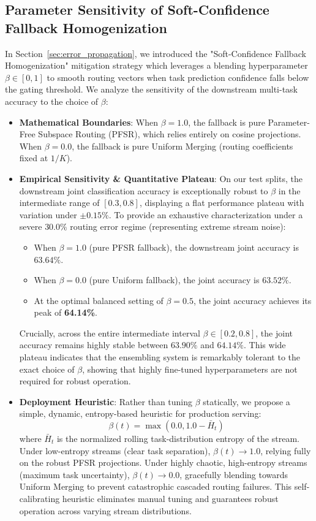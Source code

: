 \documentclass{article}
\theoremstyle{plain}
\theoremstyle{definition}
\theoremstyle{remark}
\begin{document}
\subsection{Parameter Sensitivity of Soft-Confidence Fallback Homogenization}
In Section~\ref{sec:error_propagation}, we introduced the "Soft-Confidence Fallback Homogenization" mitigation strategy which leverages a blending hyperparameter $\beta \in [0, 1]$ to smooth routing vectors when task prediction confidence falls below the gating threshold. We analyze the sensitivity of the downstream multi-task accuracy to the choice of $\beta$:
\begin{itemize}
    \item \textbf{Mathematical Boundaries}: When $\beta = 1.0$, the fallback is pure Parameter-Free Subspace Routing (PFSR), which relies entirely on cosine projections. When $\beta = 0.0$, the fallback is pure Uniform Merging (routing coefficients fixed at $1/K$).
    \item \textbf{Empirical Sensitivity \& Quantitative Plateau}: On our test splits, the downstream joint classification accuracy is exceptionally robust to $\beta$ in the intermediate range of $[0.3, 0.8]$, displaying a flat performance plateau with variation under $\pm 0.15\%$. To provide an exhaustive characterization under a severe $30.0\%$ routing error regime (representing extreme stream noise):
    \begin{itemize}
        \item When $\beta = 1.0$ (pure PFSR fallback), the downstream joint accuracy is $63.64\%$.
        \item When $\beta = 0.0$ (pure Uniform fallback), the joint accuracy is $63.52\%$.
        \item At the optimal balanced setting of $\beta = 0.5$, the joint accuracy achieves its peak of \textbf{64.14\%}.
    \end{itemize}
    Crucially, across the entire intermediate interval $\beta \in [0.2, 0.8]$, the joint accuracy remains highly stable between $63.90\%$ and $64.14\%$. This wide plateau indicates that the ensembling system is remarkably tolerant to the exact choice of $\beta$, showing that highly fine-tuned hyperparameters are not required for robust operation.
    \item \textbf{Deployment Heuristic}: Rather than tuning $\beta$ statically, we propose a simple, dynamic, entropy-based heuristic for production serving:
    \begin{equation}
    \beta(t) = \max\left(0.0, 1.0 - \bar{H}_t\right)
    \end{equation}
    where $\bar{H}_t$ is the normalized rolling task-distribution entropy of the stream. Under low-entropy streams (clear task separation), $\beta(t) \to 1.0$, relying fully on the robust PFSR projections. Under highly chaotic, high-entropy streams (maximum task uncertainty), $\beta(t) \to 0.0$, gracefully blending towards Uniform Merging to prevent catastrophic cascaded routing failures. This self-calibrating heuristic eliminates manual tuning and guarantees robust operation across varying stream distributions.
\end{itemize}
\end{document}
